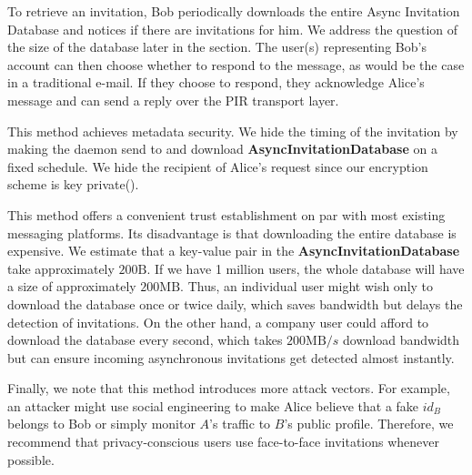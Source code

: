 To retrieve an invitation, Bob periodically downloads the entire Async Invitation Database and notices if there are invitations for him. 
We address the question of the size of the database later in the section. 
The user(s) representing Bob's account can then choose whether to respond to the message, as would be the case in a traditional e-mail. If they choose to respond, they acknowledge Alice's message and can send a reply over the PIR transport layer.

This method achieves metadata security. We hide the timing of the invitation by making the daemon send to and download \textbf{AsyncInvitationDatabase} on a fixed schedule. 
We hide the recipient of Alice's request since our encryption scheme is key private(). 

This method offers a convenient trust establishment on par with most existing messaging platforms. 
Its disadvantage is that downloading the entire database is expensive. 
We estimate that a key-value pair in the \textbf{AsyncInvitationDatabase} take approximately $200\text{B}$. 
If we have 1 million users, the whole database will have a size of approximately $200\text{MB}$.
Thus, an individual user might wish only to download the database once or twice daily, which saves bandwidth but delays the detection of invitations. 
On the other hand, a company user could afford to download the database every second, which takes $200\text{MB}/s$ download bandwidth but can ensure incoming asynchronous invitations get detected almost instantly.

Finally, we note that this method introduces more attack vectors. For example, an attacker might use social engineering to make Alice believe that a fake $id_B$ belongs to Bob or simply monitor $A$'s traffic to $B$'s public profile. Therefore, we recommend that privacy-conscious users use face-to-face invitations whenever possible.

